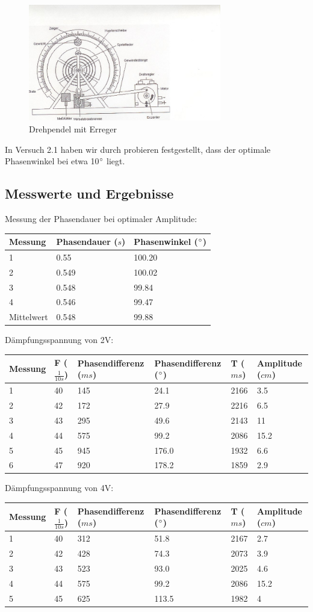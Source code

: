 \documentclass{scrartcl}
\begin{document}
\begin{figure}[h]
  \caption{Drehpendel mit Erreger}
  \centering
    \includegraphics[width=0.75\textwidth]{800px-Pohlsches_Rad}
\end{figure}

In Versuch 2.1 haben wir durch probieren festgestellt, dass der optimale Phasenwinkel bei etwa 10$\degree$ liegt. 
\subsection{Messwerte und Ergebnisse}
Messung der Phasendauer bei optimaler Amplitude:\\
\begin{tabular}{l|l|l}
Messung &Phasendauer ($s$)&Phasenwinkel ($\degree$)\\\hline
1&0.55&100.20\\
2&0.549&100.02\\
3&0.548&99.84\\
4&0.546&99.47\\
Mittelwert&0.548&99.88\\
\end{tabular}

Dämpfungsspannung von 2V:\\
\begin{tabular}{l|l|l|l|l|l}
Messung &F ($\frac{1}{10s}$)&Phasendifferenz ($ms$)&Phasendifferenz ($\degree$)&T ($ms$)&Amplitude ($cm$)\\\hline
1&40&145&24.1&2166&3.5\\
2&42&172&27.9&2216&6.5\\
3&43&295&49.6&2143&11\\
4&44&575&99.2&2086&15.2\\
5&45&945&176.0&1932&6.6\\
6&47&920&178.2&1859&2.9\\
\end{tabular}

Dämpfungsspannung von 4V:\\
\begin{tabular}{l|l|l|l|l|l}
Messung &F ($\frac{1}{10s}$)&Phasendifferenz ($ms$)&Phasendifferenz ($\degree$)&T ($ms$)&Amplitude ($cm$)\\\hline
1&40&312&51.8&2167&2.7\\
2&42&428&74.3&2073&3.9\\
3&43&523&93.0&2025&4.6\\
4&44&575&99.2&2086&15.2\\
5&45&625&113.5&1982&4\\
\end{tabular}
\end{document}
